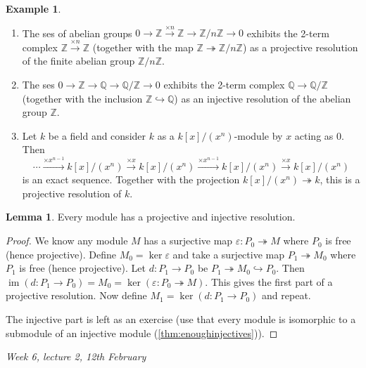 \documentclass{article}
\newcommand{\Z}{\mathbb{Z}}
\newcommand{\Q}{\mathbb{Q}}
\newcommand{\im}{\operatorname{im}}
\theoremstyle{definition}
\newtheorem{lemma}[defn]{Lemma}
\newtheorem{example}[defn]{Example}
\begin{document}
\begin{example}
\begin{enumerate}
\item The ses of abelian groups $0\rightarrow\Z\xrightarrow{\times n}\Z\rightarrow\Z/n\Z\rightarrow 0$ exhibits the 2-term complex $\Z\xrightarrow{\times n}\Z$ (together with the map $\Z\twoheadrightarrow\Z/n\Z$) as a projective resolution of the finite abelian group $\Z/n\Z$.
\item The ses $0\rightarrow\Z\rightarrow\Q\rightarrow\Q/\Z\rightarrow 0$ exhibits the 2-term complex $\Q\rightarrow\Q/\Z$ (together with the inclusion $\Z\hookrightarrow\Q$) as an injective resolution of the abelian group $\Z$.
\item Let $k$ be a field and consider $k$ as a $k[x]/(x^n)$-module by $x$ acting as 0. Then
\[
\cdots \xrightarrow{\times x^{n-1}} k[x]/(x^n) \xrightarrow{\times x} k[x]/(x^n) \xrightarrow{\times x^{n-1}} k[x]/(x^n) \xrightarrow{\times x} k[x]/(x^n)
\]
is an exact sequence. Together with the projection $k[x]/(x^n)\twoheadrightarrow k$, this is a projective resolution of $k$.
\end{enumerate}
\end{example}

\begin{lemma}
Every module has a projective and injective resolution.
\end{lemma}
\begin{proof}
We know any module $M$ has a surjective map $\varepsilon:P_0\twoheadrightarrow M$ where $P_0$ is free (hence projective). Define $M_0=\ker\varepsilon$ and take a surjective map $P_1\twoheadrightarrow M_0$ where $P_1$ is free (hence projective). Let $d:P_1\rightarrow P_0$ be $P_1\twoheadrightarrow M_0\hookrightarrow P_0$. Then $\im(d:P_1\rightarrow P_0)=M_0=\ker(\varepsilon:P_0\twoheadrightarrow M)$. This gives the first part of a projective resolution. Now define $M_1=\ker(d:P_1\rightarrow P_0)$ and repeat.

The injective part is left as an exercise (use that every module is isomorphic to a submodule of an injective module (\ref{thm:enoughinjectives})).
\end{proof}

\begin{flushright}
\textit{Week 6, lecture 2, 12th February}
\end{flushright}
\end{document}
